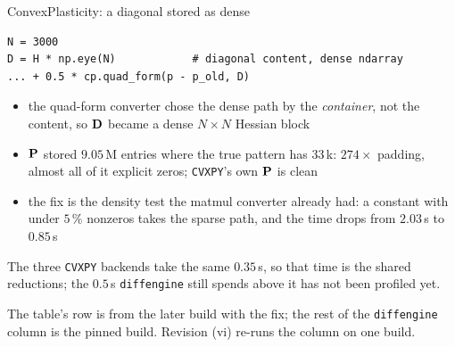 \documentclass[10pt,mathserif,aspectratio=169]{beamer}
\newcommand{\bul}{\setlength\itemsep{1.1ex}}
\newcommand{\de}{\texttt{diffengine}}
\newcommand{\cvxpy}{\texttt{CVXPY}}
\begin{document}
\begin{frame}[fragile,label=bk-plasticity]{ConvexPlasticity: a diagonal stored as dense}
\vspace{-0.5ex}
\begin{center}
\begin{minipage}{0.80\textwidth}
\begin{lstlisting}[language=mypython, basicstyle=\ttfamily\small,
                   aboveskip=0.4em, belowskip=0.4em]
N = 3000
D = H * np.eye(N)            # diagonal content, dense ndarray
... + 0.5 * cp.quad_form(p - p_old, D)
\end{lstlisting}
\end{minipage}
\end{center}

\begin{itemize}\small\bul
  \item the quad-form converter chose the dense path by the \emph{container}, not the content,
        so $\mathbf{D}$ became a dense $N \times N$ Hessian block
  \item $\mathbf{P}$ stored $9.05$\,M entries where the true pattern has $33$\,k: $274\times$
        padding, almost all of it explicit zeros; \cvxpy{}'s own $\mathbf{P}$ is clean
  \item the fix is the density test the matmul converter already had: a constant with under
        $5\,\%$ nonzeros takes the sparse path, and the time drops from $2.03$\,s to $0.85$\,s
\end{itemize}

\begin{center}\small\color{polyblue}
The three \cvxpy{} backends take the same $0.35$\,s, so that time is the shared reductions;
the $0.5$\,s \de{} still spends above it has not been profiled yet.
\end{center}

\vfill
{\scriptsize\color{black!55} The table's row is from the later build with the fix; the rest
of the \de{} column is the pinned build. Revision (vi) re-runs the column on one build.}
\end{frame}
\end{document}
